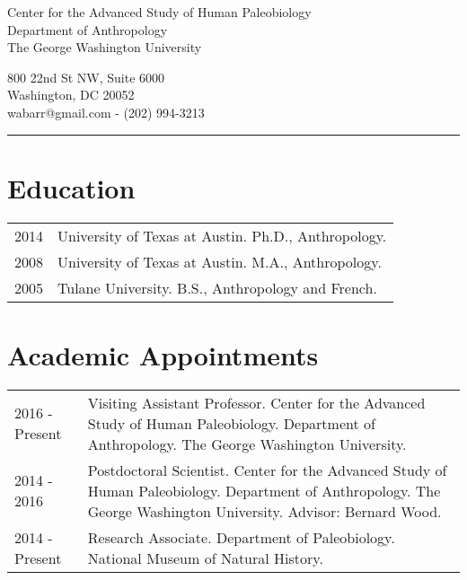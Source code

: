 \documentclass{article}
\begin{document}
\begin{center}
\end{center}

\vspace{15pt}

\noindent\begin{minipage}{.60\textwidth}
\begin{flushleft}
Center for the Advanced Study of Human Paleobiology\\
Department of Anthropology\\
The George Washington University\\
\end{flushleft}
\end{minipage}
\begin{minipage}{.395\textwidth}
\begin{flushright}
800 22nd St NW, Suite 6000\\
Washington, DC 20052 \\
wabarr@gmail.com - (202) 994-3213\\
\end{flushright}
\end{minipage}


\noindent\rule[-2mm]{\textwidth}{1pt}

\section*{Education}

\begin{tabular}{p{}p{}}
2014 & University of Texas at Austin. Ph.D., Anthropology. \\[4pt] %
2008 & University of Texas at Austin. M.A., Anthropology. \\[4pt]
2005 & Tulane University. B.S., Anthropology and French.\\
\end{tabular}


\section*{Academic Appointments}
\begin{tabular}{p{}p{}}
2016 - Present & Visiting Assistant Professor. Center for the Advanced Study of Human Paleobiology. Department of Anthropology. The George Washington University.\\[4pt]
2014 - 2016 & Postdoctoral Scientist. Center for the Advanced Study of Human Paleobiology. Department of Anthropology. The George Washington University. Advisor: Bernard Wood.\\[4pt]
2014 - Present & Research Associate. Department of Paleobiology.  National Museum of Natural History.\\
\end{tabular}
\end{document}
